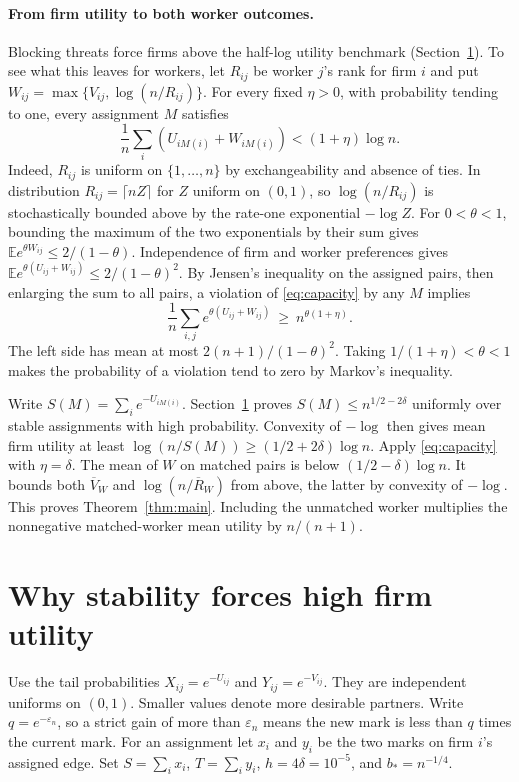 \documentclass[11pt]{article}
\newcommand{\E}{\mathbb E}
\newcommand{\eps}{\varepsilon_n}
\begin{document}
\paragraph{From firm utility to both worker outcomes.}
Blocking threats force firms above the half-log utility benchmark
(Section~\ref{sec:firm}). To see what this leaves for workers, let
$R_{ij}$ be worker $j$'s rank for firm $i$ and put
$W_{ij}=\max\{V_{ij},\log(n/R_{ij})\}$. For every fixed $\eta>0$,
with probability tending to one, every assignment $M$ satisfies
\begin{equation}\label{eq:capacity}
  \frac1n\sum_i (U_{iM(i)}+W_{iM(i)}) < (1+\eta)\log n .
\end{equation}
Indeed, $R_{ij}$ is uniform on $\{1,\ldots,n\}$ by exchangeability and
absence of ties. In distribution $R_{ij}=\lceil nZ\rceil$ for $Z$ uniform
on $(0,1)$, so $\log(n/R_{ij})$ is stochastically bounded above by the
rate-one exponential $-\log Z$. For $0<\theta<1$, bounding the maximum
of the two exponentials by their sum gives
$\E e^{\theta W_{ij}}\le 2/(1-\theta)$. Independence of firm and worker
preferences gives $\E e^{\theta(U_{ij}+W_{ij})}\le 2/(1-\theta)^2$.
By Jensen's inequality on the assigned pairs, then enlarging the sum to
all pairs, a violation of \eqref{eq:capacity} by any $M$ implies
\[
 \frac1n\sum_{i,j}e^{\theta(U_{ij}+W_{ij})}\ \ge\ n^{\theta(1+\eta)}.
\]
The left side has mean at most $2(n+1)/(1-\theta)^2$. Taking
$1/(1+\eta)<\theta<1$ makes the probability of a violation tend to zero
by Markov's inequality.

Write $S(M)=\sum_i e^{-U_{iM(i)}}$. Section~\ref{sec:firm} proves
$S(M)\le n^{1/2-2\delta}$ uniformly over stable assignments with high
probability. Convexity of $-\log$ then gives mean firm utility at least
$\log(n/S(M))\ge(1/2+2\delta)\log n$. Apply \eqref{eq:capacity} with
$\eta=\delta$. The mean of $W$ on matched pairs is below
$(1/2-\delta)\log n$. It bounds both $\overline V_W$ and
$\log(n/\overline R_W)$ from above, the latter by convexity of $-\log$.
This proves Theorem~\ref{thm:main}. Including the unmatched worker multiplies
the nonnegative matched-worker mean utility by $n/(n+1)$.

\section{Why stability forces high firm utility}\label{sec:firm}

Use the tail probabilities $X_{ij}=e^{-U_{ij}}$ and $Y_{ij}=e^{-V_{ij}}$.
They are independent uniforms on $(0,1)$. Smaller values denote more
desirable partners. Write $q=e^{-\eps}$, so a strict gain of more than
$\eps$ means the new mark is less than $q$ times the current mark.
For an assignment let $x_i$ and $y_i$ be the two marks on firm $i$'s
assigned edge. Set $S=\sum_i x_i$, $T=\sum_i y_i$, $h=4\delta=10^{-5}$,
and $b_*=n^{-1/4}$.
\end{document}
